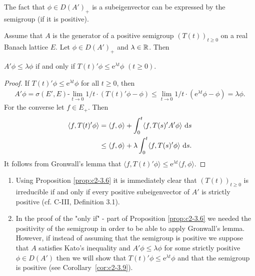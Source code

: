 The fact that $\phi \in D(A')_{+}$ is a subeigenvector can be expressed by the
semigroup (if it is positive).
\begin{proposition}\label{prop:c2-3.6}
Assume that $A$ is the generator of a positive semigroup $(T(t))_{t \geq 0}$ on a real Banach lattice $E$. 
Let $\phi \in D(A')_{+}$ and $\lambda \in \mathbb{R}$. 
Then
\begin{center}
$A'\phi \leq \lambda \phi$ if and only if  $T(t)'\phi \leq \mathrm{e}^{\lambda t}\phi$ $(t \geq 0)$.
\end{center}
\end{proposition}
\begin{proof}
If $T(t)'\phi \leq \mathrm{e}^{\lambda t} \phi$ for all $t \geq 0$, then
\begin{align*}
A'\phi = \sigma(E',E)\text{-}\lim_{t \to 0} 1/t \cdot (T(t)'\phi - \phi) \leq \lim_{t \to 0} 1/t \cdot (\mathrm{e}^{\lambda t}\phi - \phi) = \lambda\phi.
\end{align*}
For the converse let $f \in E_{+}$. Then
\begin{align*}
\langle f,T(t)'\phi \rangle &= \langle f,\phi \rangle + \int_{0}^{t} \langle f,T(s)'A'\phi \rangle \, \mathop{}\!\mathrm{d}{s}\\
&\leq \langle f,\phi \rangle + \lambda \int_{0}^{t} \langle f,T(s)'\phi \rangle \, \mathop{}\!\mathrm{d}{s}.
\end{align*}
It follows from Gronwall's lemma that $\langle f,T(t)'\phi \rangle \leq \mathrm{e}^{\lambda t} \langle f,\phi \rangle$.
\end{proof}
\begin{remark}\label{rem:c2-3.7}
\begin{enumerate}[\upshape (i), wide, labelindent=.5em]%
\item \label{rem:c2-3.7-1}
Using Proposition \ref{prop:c2-3.6} it is immediately clear that
$(T(t))_{t \geq 0}$ is irreducible if and only if every positive subeigenvector
of $A'$ is strictly positive (cf. C-III, Definition 3.1). 

\item \label{rem:c2-3.7-2}
In the proof of the "only if" - part of Proposition \ref{prop:c2-3.6} we needed the
positivity of the semigroup in order to be able to apply Gronwall's
lemma.
However, if instead of assuming that the semigroup is positive
we suppose that $A$ satisfies Kato's inequality and $A'\phi \leq \lambda\phi$ for some strictly positive $\phi \in D(A')$ then we will show that $T(t)'\phi \leq
\mathrm{e}^{\lambda t} \phi$ and that the semigroup is positive (see Corollary~\ref{cor:c2-3.9}).
\end{enumerate}
\end{remark}
